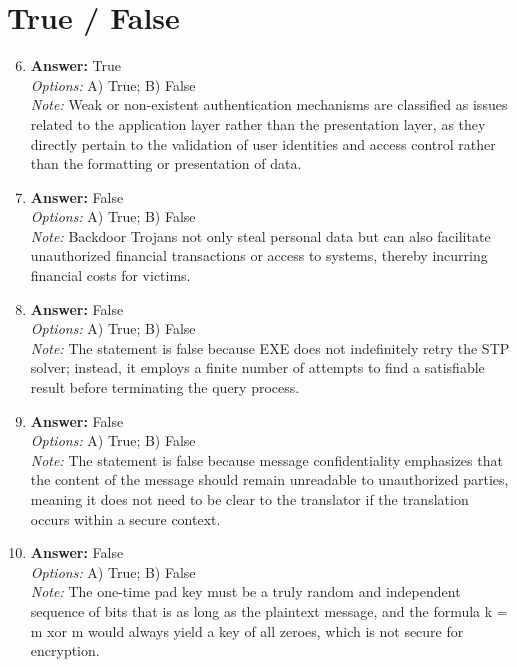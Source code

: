 \documentclass[12pt]{article}
\begin{document}
\section*{True / False}
\begin{enumerate}[label=\arabic*.]
\setcounter{enumi}{5}
\item \textbf{Answer:} True
\\ \textit{Options:} A) True; B) False
\\ \textit{Note:} Weak or non-existent authentication mechanisms are classified as issues related to the application layer rather than the presentation layer, as they directly pertain to the validation of user identities and access control rather than the formatting or presentation of data.
\item \textbf{Answer:} False
\\ \textit{Options:} A) True; B) False
\\ \textit{Note:} Backdoor Trojans not only steal personal data but can also facilitate unauthorized financial transactions or access to systems, thereby incurring financial costs for victims.
\item \textbf{Answer:} False
\\ \textit{Options:} A) True; B) False
\\ \textit{Note:} The statement is false because EXE does not indefinitely retry the STP solver; instead, it employs a finite number of attempts to find a satisfiable result before terminating the query process.
\item \textbf{Answer:} False
\\ \textit{Options:} A) True; B) False
\\ \textit{Note:} The statement is false because message confidentiality emphasizes that the content of the message should remain unreadable to unauthorized parties, meaning it does not need to be clear to the translator if the translation occurs within a secure context.
\item \textbf{Answer:} False
\\ \textit{Options:} A) True; B) False
\\ \textit{Note:} The one-time pad key must be a truly random and independent sequence of bits that is as long as the plaintext message, and the formula k = m xor m would always yield a key of all zeroes, which is not secure for encryption.
\end{enumerate}
\end{document}
